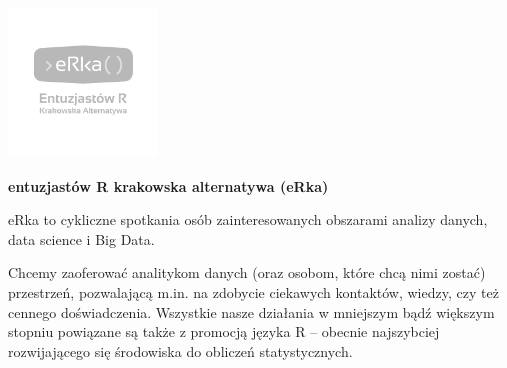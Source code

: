 \documentclass[\main/boa.tex]{subfiles}
\begin{document}
	
	\begin{minipage}[t]{0.915\textwidth}
		\center     
		\includegraphics[width=150px]{img/logos.bw/erka.png} 
	\end{minipage}
	\begin{center}
	\Large \textbf {entuzjastów R krakowska alternatywa (eRka)}
	\end{center}
	
	\vskip 0.3cm
	\normalsize 
	
	
	eRka to cykliczne spotkania osób zainteresowanych obszarami analizy danych, data science i Big Data.
	
	Chcemy zaoferować analitykom danych (oraz osobom, które chcą nimi zostać) przestrzeń, pozwalającą m.in. na zdobycie ciekawych kontaktów, wiedzy, czy też cennego doświadczenia. Wszystkie nasze działania w mniejszym bądź większym stopniu powiązane są także z promocją języka R – obecnie najszybciej rozwijającego się środowiska do obliczeń statystycznych.
	
	\vskip 1.5cm
\end{document}
